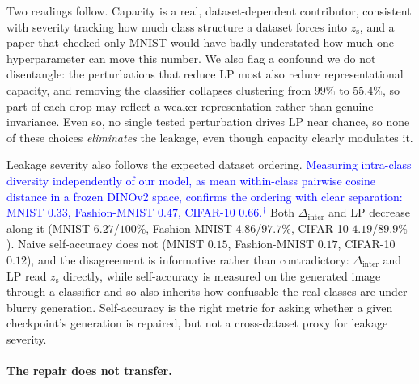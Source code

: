 \documentclass[letterpaper]{article} %
\newcommand{\pj}[1]{\textcolor{blue}{#1$^{\dagger}$}}
\newcommand{\zs}{z_{\mathrm{s}}}
\newcommand{\Dinter}{\Delta_{\mathrm{inter}}}
\begin{document}
Two readings follow. Capacity is a real, dataset-dependent contributor,
consistent with severity tracking how much class structure a dataset forces
into $\zs$, and a paper that checked only MNIST would have badly understated
how much one hyperparameter can move this number. We also flag a confound we
do not disentangle: the perturbations that reduce LP most also reduce
representational capacity, and removing the classifier collapses clustering
from $99\%$ to $55.4\%$, so part of each drop may reflect a weaker
representation rather than genuine invariance. Even so, no single tested
perturbation drives LP near chance, so none of these choices \emph{eliminates}
the leakage, even though capacity clearly modulates it.

Leakage severity also follows the expected dataset ordering. \pj{Measuring
intra-class diversity independently of our model, as mean within-class
pairwise cosine distance in a frozen DINOv2 space, confirms the ordering with
clear separation: MNIST $0.33$, Fashion-MNIST $0.47$, CIFAR-10 $0.66$.} Both
$\Dinter$ and LP decrease along it (MNIST $6.27$/$100\%$, Fashion-MNIST
$4.86$/$97.7\%$, CIFAR-10 $4.19$/$89.9\%$). Naive self-accuracy does not
(MNIST $0.15$, Fashion-MNIST $0.17$, CIFAR-10 $0.12$), and the disagreement
is informative rather than contradictory: $\Dinter$ and LP read $\zs$
directly, while self-accuracy is measured on the generated image through a
classifier and so also inherits how confusable the real classes are under
blurry generation. Self-accuracy is the right metric for asking whether a
given checkpoint's generation is repaired, but not a cross-dataset proxy for
leakage severity.

\paragraph{The repair does not transfer.}
\end{document}

